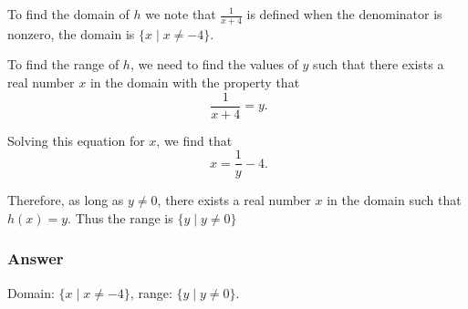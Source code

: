 To find the domain of $h$ we note that $ \frac{1}{x + 4} $ is defined when the denominator is nonzero, the domain is $\{x \mid x \ne -4\}$.

To find the range of $h$, we need to find the values of $y$ such that there exists a real number $x$ in the domain with the property that
\[\phantom{.} \frac{1}{x + 4} = y \text{.}\]

Solving this equation for $x$, we find that
\[ \phantom{.} x = \frac{1}{y} -4 \text{.} \]

Therefore, as long as $ y \ne 0 $, there exists a real number $ x $ in the domain such that $h(x) = y$. Thus the range is $\{y \mid y \ne 0\}$
\subsubsection*{Answer}

Domain: $\{x \mid x \ne -4\}$, range: $\{y \mid y \ne 0\}$.
